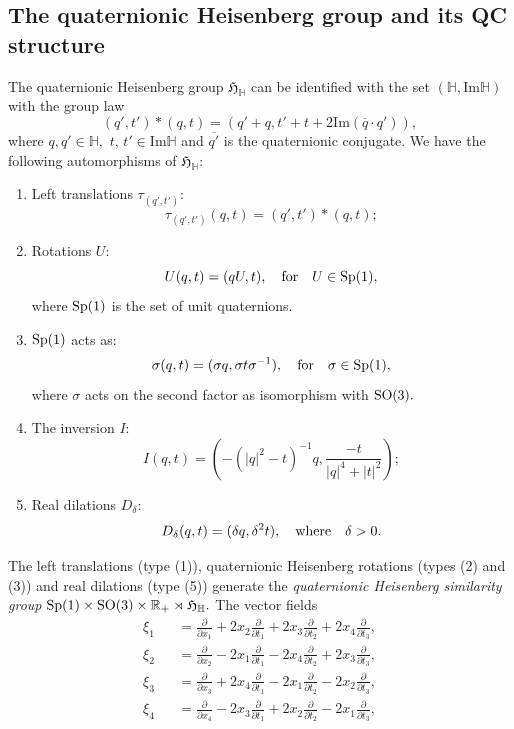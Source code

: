 \documentclass [12pt,a4paper]{amsart}
\renewcommand{\Im}{\textrm{Im}}
\newcommand{\R}{\mathbb{R}}
\newcommand{\mH}{\mathbb{H}}
\newcommand{\frakH}{\mathfrak{H}}
\theoremstyle{plain}
\theoremstyle{definition}
\numberwithin{equation}{section}
\begin{document}
\subsection{The quaternionic Heisenberg group and its QC structure}\label{subsec:QC}
The quaternionic Heisenberg group $\frakH_{\mH}$ can be identified with the set $(\mH, \Im\mH)$ with the group law
\begin{equation}
(q', t')\ast(q,t)=(q'+q, t'+t+2\Im(\overline{q}\cdot q')),
\end{equation}
where $q, q'\in\mH,$ $t,\,t'\in\Im\mH$ and $\overline{q'}$ is the quaternionic conjugate. We have the following automorphisms of $\frakH_\mH:$
\begin{enumerate}
\item[{(1)}] Left translations $\tau_{(q', t')}:$
$$\tau_{(q', t')}(q, t)=(q', t')\ast(q, t);$$
\item[{(2)}] Rotations $U:$
$$U(q, t)=(qU, t), \quad {\rm for}\quad U\in{\rm Sp(1)},$$
where ${\rm Sp(1)}$ is the set of unit quaternions.
\item[{(3)}] ${\rm Sp(1)}$ acts as:
$$\sigma(q, t)=(\sigma q, \sigma t\sigma^{-1}),\quad {\rm for}\quad \sigma\in{\rm Sp(1)},$$
where $\sigma$ acts on the second factor as isomorphism with ${\rm SO(3)}.$
\item[{(4)}] The inversion $I:$
$$
I(q, t)=\left(-(|q|^2-t)^{-1}q, \frac{-t}{|q|^4+|t|^2}\right);
$$
\item[{(5)}]  Real dilations $D_\delta:$ 
$$D_\delta(q, t)=(\delta q, \delta^2 t), \quad {\rm where}\quad \delta>0.$$
\end{enumerate}
The left translations (type (1)), quaternionic Heisenberg rotations (types (2) and (3)) and real dilations (type (5)) generate the {\it quaternionic Heisenberg similarity group} ${\rm Sp}(1)\times {\rm SO(3)}\times \R_+\rtimes\frakH_\mH.$
The vector fields
\begin{eqnarray*}
\xi_1&&=\displaystyle{\frac{\partial}{\partial x_1}+2x_2\frac{\partial}{\partial t_1}+2x_3\frac{\partial}{\partial t_2}+2x_4\frac{\partial}{\partial t_3}},\\
\xi_2&&=\displaystyle{\frac{\partial}{\partial x_2}-2x_1\frac{\partial}{\partial t_1}-2x_4\frac{\partial}{\partial t_2}+2x_3\frac{\partial}{\partial t_3}},\\
\xi_3&&=\displaystyle{\frac{\partial}{\partial x_3}+2x_4\frac{\partial}{\partial t_1}-2x_1\frac{\partial}{\partial t_2}-2x_2\frac{\partial}{\partial t_3}},\\
\xi_4&&=\displaystyle{\frac{\partial}{\partial x_4}-2x_3\frac{\partial}{\partial t_1}+2x_2\frac{\partial}{\partial t_2}-2x_1\frac{\partial}{\partial t_3}},
\end{eqnarray*}
\end{document}
